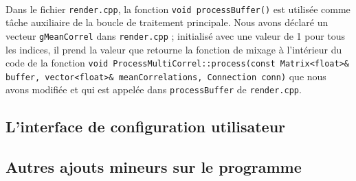 \paragraph{}
Dans le fichier \verb!render.cpp!, la fonction
\verb!void processBuffer()! est utilisée comme tâche auxiliaire de la
boucle de traitement principale. Nous avons déclaré un vecteur
\verb!gMeanCorrel! dans \verb!render.cpp! ; initialisé avec une valeur
de 1 pour tous les indices, il prend la valeur que retourne la
fonction de mixage à l'intérieur du code de la fonction
\verb!void ProcessMultiCorrel::process(const Matrix<float>& buffer, vector<float>& meanCorrelations, Connection conn)!
que nous avons modifiée et qui est appelée dans \verb!processBuffer!
de \verb!render.cpp!.

\subsection{L'interface de configuration utilisateur}

\subsection{Autres ajouts mineurs sur le programme}
